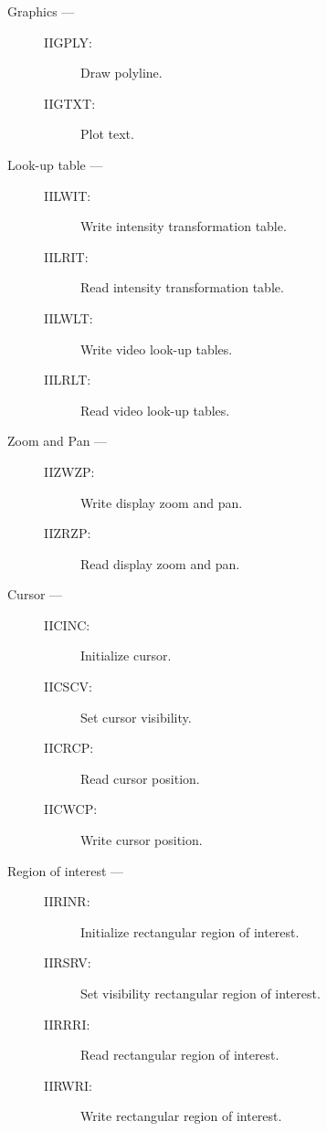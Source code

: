 \begin{description}
\item [Graphics ---]

\begin{description}
\item [IIGPLY:]  Draw polyline.
\item [IIGTXT:]  Plot text.
\end{description}

\item [Look-up table ---]

\begin{description}
\item [IILWIT:]  Write intensity transformation table.
\item [IILRIT:]  Read intensity transformation table.
\item [IILWLT:]  Write video look-up tables.
\item [IILRLT:]  Read video look-up tables.
\end{description}

\item [Zoom and Pan ---]

\begin{description}
\item [IIZWZP:]  Write display zoom and pan.
\item [IIZRZP:]  Read display zoom and pan.
\end{description}

\item [Cursor ---]

\begin{description}
\item [IICINC:]  Initialize cursor.
\item [IICSCV:]  Set cursor visibility.
\item [IICRCP:]  Read cursor position.
\item [IICWCP:]  Write cursor position.
\end{description}

\item [Region of interest ---]

\begin{description}
\item [IIRINR:]  Initialize rectangular region of interest.
\item [IIRSRV:]  Set visibility rectangular region of interest.
\item [IIRRRI:]  Read rectangular region of interest.
\item [IIRWRI:]  Write rectangular region of interest.
\end{description}


\end{description}

